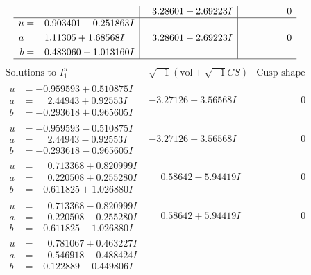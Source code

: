 \documentclass[1p]{elsarticle_modified}
\theoremstyle{definition}
\newcommand{\I}{\sqrt{-1}}
\begin{document}
$$\begin{array}{c|c|c}
 & \phantom{-}3.28601 + 2.69223 I & \phantom{-0.000000 } 0 \\ \hline\begin{aligned}
u &= -0.903401 - 0.251863 I \\
a &= \phantom{-}1.11305 + 1.68568 I \\
b &= \phantom{-}0.483060 - 1.013160 I\end{aligned}
 & \phantom{-}3.28601 - 2.69223 I & \phantom{-0.000000 } 0\\
 \hline 
 \end{array}$$\newpage$$\begin{array}{c|c|c}  
\text{Solutions to }I^u_{1}& \I (\text{vol} + \sqrt{-1}CS) & \text{Cusp shape}\\
 \hline 
\begin{aligned}
u &= -0.959593 + 0.510875 I \\
a &= \phantom{-}2.44943 + 0.92553 I \\
b &= -0.293618 + 0.965605 I\end{aligned}
 & -3.27126 - 3.56568 I & \phantom{-0.000000 } 0 \\ \hline\begin{aligned}
u &= -0.959593 - 0.510875 I \\
a &= \phantom{-}2.44943 - 0.92553 I \\
b &= -0.293618 - 0.965605 I\end{aligned}
 & -3.27126 + 3.56568 I & \phantom{-0.000000 } 0 \\ \hline\begin{aligned}
u &= \phantom{-}0.713368 + 0.820999 I \\
a &= \phantom{-}0.220508 + 0.255280 I \\
b &= -0.611825 + 1.026880 I\end{aligned}
 & \phantom{-}0.58642 - 5.94419 I & \phantom{-0.000000 } 0 \\ \hline\begin{aligned}
u &= \phantom{-}0.713368 - 0.820999 I \\
a &= \phantom{-}0.220508 - 0.255280 I \\
b &= -0.611825 - 1.026880 I\end{aligned}
 & \phantom{-}0.58642 + 5.94419 I & \phantom{-0.000000 } 0 \\ \hline\begin{aligned}
u &= \phantom{-}0.781067 + 0.463227 I \\
a &= \phantom{-}0.546918 - 0.488424 I \\
b &= -0.122889 - 0.449806 I\end{aligned}

\end{array}$$
\end{document}
